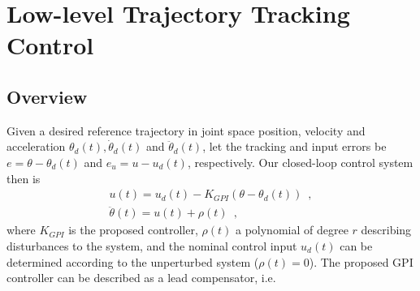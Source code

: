 \documentclass[letterpaper, 10pt, conference]{ieeeconf}      %
\begin{document}















\section{Low-level Trajectory Tracking Control}
\label{sec:methods}

\subsection{Overview}
Given a desired reference trajectory in joint space position, velocity and acceleration  $\theta_d(t),\dot{\theta}_d(t)$ and $\ddot{\theta}_d(t)$, let the tracking and input errors be $e = \theta - \theta_d(t)$ and $e_u = u - u_d(t)$, respectively. Our closed-loop control system then is
%
\begin{equation}
\begin{aligned}
        u(t) = u_d(t) - K_{GPI}(\theta-\theta_d(t))\enspace, \\
        \ddot{\theta}(t) = u(t) + \rho(t)\enspace,
\end{aligned}
    \label{eq:ccon1}
\end{equation}
%
\noindent where $K_{GPI}$ is the proposed controller, $\rho(t)$ a polynomial of degree $r$ describing disturbances to the system, and the nominal control input $u_d(t)$ can be determined according to the unperturbed system ($\rho(t)=0$). The proposed GPI controller can be described as a lead compensator, i.e.
\end{document}
